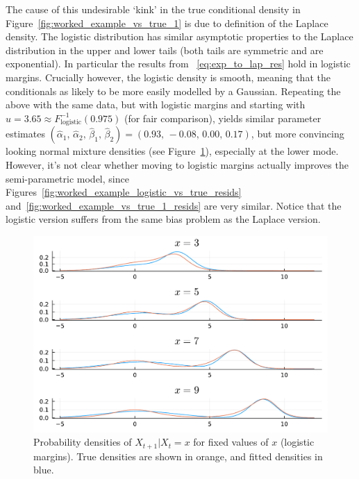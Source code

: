 \documentclass[11pt,twoside,openany]{book}
\numberwithin{Theorem}{chapter}
\numberwithin{Definition}{chapter}
\numberwithin{Lemma}{chapter}
\numberwithin{Algorithm}{chapter}
\numberwithin{equation}{chapter}
\begin{document}
The cause of this undesirable `kink' in the true conditional density
in Figure~\ref{fig:worked_example_vs_true_1} is
due to definition of the Laplace density. The logistic distribution has
similar asymptotic properties to the Laplace distribution in the upper and lower tails (both tails are symmetric and are exponential).
In particular the
results from ~\eqref{eq:exp_to_lap_res} hold in logistic margins.
Crucially however, the logistic density is smooth, meaning that the conditionals
as likely to be more easily modelled by a Gaussian. Repeating the above with the same
data, but with logistic margins and starting with $u=3.65\approx
F_{\text{logistic}}^{-1}(0.975)$ (for fair comparison), yields
similar parameter estimates $(\hat\alpha_1,\,\hat\alpha_2,\,\hat\beta_1,\,\hat\beta_2)=(0.93,\,-0.08,\,0.00,\,0.17)$, but more convincing looking
normal mixture densities (see Figure~\ref{fig:worked_example_logistic_vs_true}),
especially at the lower mode. However, it's not clear whether moving to logistic
margins actually improves the semi-parametric model, since Figures~\ref{fig:worked_example_logistic_vs_true_resids} and~\ref{fig:worked_example_vs_true_1_resids} are very similar. Notice that the logistic version suffers from the same bias problem as the Laplace version.


\begin{figure}[htp]
  \centering
  \includegraphics[scale=0.7]{../ht-em/figures/worked_example_logistic_vs_true.pdf}
  \caption{Probability densities of $X_{t+1}|X_{t}=x$ for fixed values of $x$ (logistic margins).
    True densities are shown in orange, and fitted densities in blue.
   }\label{fig:worked_example_logistic_vs_true}
\end{figure}
\end{document}

